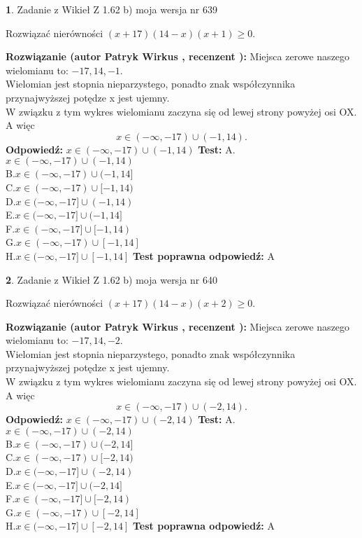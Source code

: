 \documentclass[12pt, a4paper]{article}
\theoremstyle{definition} %
\newtheorem{zad}{}
\newcommand{\zadStart}[1]{\begin{zad}#1\newline}
\newcommand{\zadStop}{\end{zad}}
\newcommand{\rozwStart}[2]{\noindent \textbf{Rozwiązanie (autor #1 , recenzent #2): }\newline}
\newcommand{\rozwStop}{\newline}
\newcommand{\odpStart}{\noindent \textbf{Odpowiedź:}\newline}
\newcommand{\odpStop}{\newline}
\newcommand{\testStart}{\noindent \textbf{Test:}\newline}
\newcommand{\testStop}{\newline}
\newcommand{\kluczStart}{\noindent \textbf{Test poprawna odpowiedź:}\newline}
\newcommand{\kluczStop}{\newline}
\begin{document}
\zadStart{Zadanie z Wikieł Z 1.62 b) moja wersja nr 639}

Rozwiązać nierówności $(x+17)(14-x)(x+1)\ge0$.
\zadStop
\rozwStart{Patryk Wirkus}{}
Miejsca zerowe naszego wielomianu to: $-17, 14, -1$.\\
Wielomian jest stopnia nieparzystego, ponadto znak współczynnika przy\linebreak najwyższej potędze x jest ujemny.\\ W związku z tym wykres wielomianu zaczyna się od lewej strony powyżej osi OX. A więc $$x \in (-\infty,-17) \cup (-1,14).$$
\rozwStop
\odpStart
$x \in (-\infty,-17) \cup (-1,14)$
\odpStop
\testStart
A.$x \in (-\infty,-17) \cup (-1,14)$\\
B.$x \in (-\infty,-17) \cup (-1,14]$\\
C.$x \in (-\infty,-17) \cup [-1,14)$\\
D.$x \in (-\infty,-17] \cup (-1,14)$\\
E.$x \in (-\infty,-17] \cup (-1,14]$\\
F.$x \in (-\infty,-17] \cup [-1,14)$\\
G.$x \in (-\infty,-17) \cup [-1,14]$\\
H.$x \in (-\infty,-17] \cup [-1,14]$
\testStop
\kluczStart
A
\kluczStop



\zadStart{Zadanie z Wikieł Z 1.62 b) moja wersja nr 640}

Rozwiązać nierówności $(x+17)(14-x)(x+2)\ge0$.
\zadStop
\rozwStart{Patryk Wirkus}{}
Miejsca zerowe naszego wielomianu to: $-17, 14, -2$.\\
Wielomian jest stopnia nieparzystego, ponadto znak współczynnika przy\linebreak najwyższej potędze x jest ujemny.\\ W związku z tym wykres wielomianu zaczyna się od lewej strony powyżej osi OX. A więc $$x \in (-\infty,-17) \cup (-2,14).$$
\rozwStop
\odpStart
$x \in (-\infty,-17) \cup (-2,14)$
\odpStop
\testStart
A.$x \in (-\infty,-17) \cup (-2,14)$\\
B.$x \in (-\infty,-17) \cup (-2,14]$\\
C.$x \in (-\infty,-17) \cup [-2,14)$\\
D.$x \in (-\infty,-17] \cup (-2,14)$\\
E.$x \in (-\infty,-17] \cup (-2,14]$\\
F.$x \in (-\infty,-17] \cup [-2,14)$\\
G.$x \in (-\infty,-17) \cup [-2,14]$\\
H.$x \in (-\infty,-17] \cup [-2,14]$
\testStop
\kluczStart
A
\kluczStop
\end{document}
